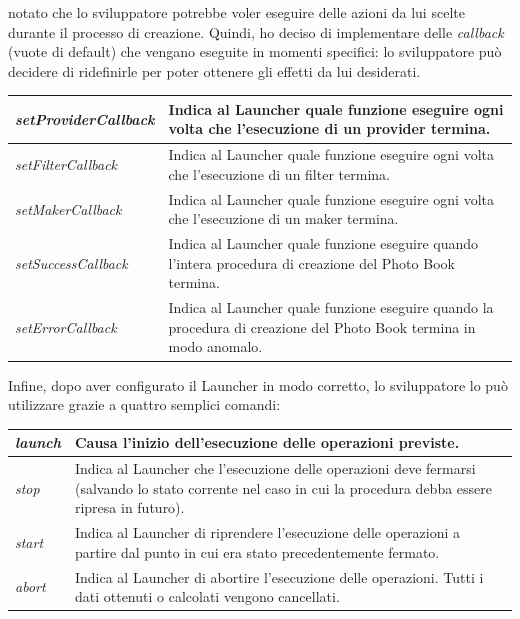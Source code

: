 				notato che lo sviluppatore potrebbe voler eseguire delle azioni da lui scelte durante il processo di creazione.
				Quindi, ho deciso di implementare delle \emph{callback} (vuote di default) che vengano eseguite in momenti specifici:
				lo sviluppatore può decidere di ridefinirle per poter ottenere gli effetti da lui desiderati.
				\begin{center}
					\begin{tabular}[H]{p{} p{}}
						\emph{setProviderCallback}	& Indica al Launcher quale funzione eseguire ogni volta che
										  l'esecuzione di un provider termina.\\
						\hline
						\emph{setFilterCallback}	& Indica al Launcher quale funzione eseguire ogni volta che
										  l'esecuzione di un filter termina.\\
						\hline
						\emph{setMakerCallback}		& Indica al Launcher quale funzione eseguire ogni volta che
										  l'esecuzione di un maker termina.\\
						\hline
						\emph{setSuccessCallback}	& Indica al Launcher quale funzione eseguire quando l'intera
										  procedura di creazione del Photo Book termina.\\
						\hline
						\emph{setErrorCallback}		& Indica al Launcher quale funzione eseguire quando la procedura di
										  creazione del Photo Book termina in modo anomalo.\\
					\end{tabular}
				\end{center}
				Infine, dopo aver configurato il Launcher in modo corretto, lo sviluppatore lo può utilizzare grazie a quattro
				semplici comandi:
				\begin{center}
					\begin{tabular}[H]{p{} p{}}
						\emph{launch}			& Causa l'inizio dell'esecuzione delle operazioni previste.\\
						\hline
						\emph{stop}			& Indica al Launcher che l'esecuzione delle operazioni deve fermarsi
										  (salvando lo stato corrente nel caso in cui la procedura debba
										  essere ripresa in futuro).\\
						\hline
						\emph{start}			& Indica al Launcher di riprendere l'esecuzione delle operazioni a
										  partire dal punto in cui era stato precedentemente fermato.\\
						\hline
						\emph{abort}			& Indica al Launcher di abortire l'esecuzione delle operazioni. Tutti
										  i dati ottenuti o calcolati vengono cancellati.\\
					\end{tabular}
				\end{center}
